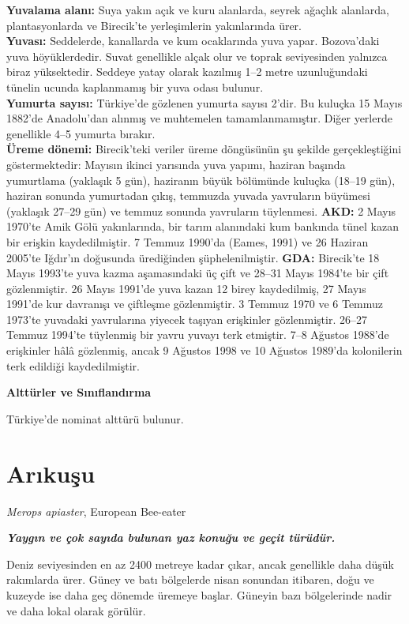 \documentclass[
  10.5pt,
  a4paper,
  DIV=11,
  numbers=noendperiod,
  twocolumn]{scrreprt}
\begin{document}
\textbf{Yuvalama alanı:} Suya yakın açık ve kuru alanlarda, seyrek
ağaçlık alanlarda, plantasyonlarda ve Birecik'te yerleşimlerin
yakınlarında ürer.\\
\textbf{Yuvası:} Seddelerde, kanallarda ve kum ocaklarında yuva yapar.
Bozova'daki yuva höyüklerdedir. Suvat genellikle alçak olur ve toprak
seviyesinden yalnızca biraz yüksektedir. Seddeye yatay olarak kazılmış
1--2 metre uzunluğundaki tünelin ucunda kaplanmamış bir yuva odası
bulunur.\\
\textbf{Yumurta sayısı:} Türkiye'de gözlenen yumurta sayısı 2'dir. Bu
kuluçka 15 Mayıs 1882'de Anadolu'dan alınmış ve muhtemelen
tamamlanmamıştır. Diğer yerlerde genellikle 4--5 yumurta bırakır.\\
\textbf{Üreme dönemi:} Birecik'teki veriler üreme döngüsünün şu şekilde
gerçekleştiğini göstermektedir: Mayısın ikinci yarısında yuva yapımı,
haziran başında yumurtlama (yaklaşık 5 gün), haziranın büyük bölümünde
kuluçka (18--19 gün), haziran sonunda yumurtadan çıkış, temmuzda yuvada
yavruların büyümesi (yaklaşık 27--29 gün) ve temmuz sonunda yavruların
tüylenmesi. \textbf{AKD:} 2 Mayıs 1970'te Amik Gölü yakınlarında, bir
tarım alanındaki kum bankında tünel kazan bir erişkin kaydedilmiştir. 7
Temmuz 1990'da (Eames, 1991) ve 26 Haziran 2005'te Iğdır'ın doğusunda
ürediğinden şüphelenilmiştir. \textbf{GDA:} Birecik'te 18 Mayıs 1993'te
yuva kazma aşamasındaki üç çift ve 28--31 Mayıs 1984'te bir çift
gözlenmiştir. 26 Mayıs 1991'de yuva kazan 12 birey kaydedilmiş, 27 Mayıs
1991'de kur davranışı ve çiftleşme gözlenmiştir. 3 Temmuz 1970 ve 6
Temmuz 1973'te yuvadaki yavrularına yiyecek taşıyan erişkinler
gözlenmiştir. 26--27 Temmuz 1994'te tüylenmiş bir yavru yuvayı terk
etmiştir. 7--8 Ağustos 1988'de erişkinler hâlâ gözlenmiş, ancak 9
Ağustos 1998 ve 10 Ağustos 1989'da kolonilerin terk edildiği
kaydedilmiştir.

\textbf{Alttürler ve Sınıflandırma}

Türkiye'de nominat alttürü bulunur.

\section{Arıkuşu}\label{arux131kuux15fu}

\emph{Merops apiaster}, European Bee-eater

\textbf{\emph{Yaygın ve çok sayıda bulunan yaz konuğu ve geçit
türüdür.}}

Deniz seviyesinden en az 2400 metreye kadar çıkar, ancak genellikle daha
düşük rakımlarda ürer. Güney ve batı bölgelerde nisan sonundan itibaren,
doğu ve kuzeyde ise daha geç dönemde üremeye başlar. Güneyin bazı
bölgelerinde nadir ve daha lokal olarak görülür.
\end{document}
